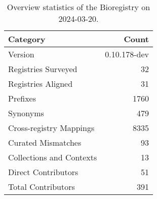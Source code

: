 \begin{table}
\caption{Overview statistics of the Bioregistry on 2024-03-20.}
\label{tab:bioregistry-summary}
\begin{tabular}{lr}
\toprule
Category & Count \\
\midrule
Version & 0.10.178-dev \\
Registries Surveyed & 32 \\
Registries Aligned & 31 \\
Prefixes & 1760 \\
Synonyms & 479 \\
Cross-registry Mappings & 8335 \\
Curated Mismatches & 93 \\
Collections and Contexts & 13 \\
Direct Contributors & 51 \\
Total Contributors & 391 \\
\bottomrule
\end{tabular}
\end{table}
